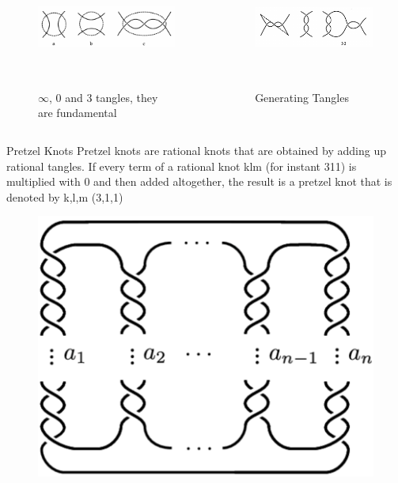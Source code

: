 \begin{frame}
	\begin{columns}[T]
		\begin{column}{.48\textwidth}
			\begin{figure}
				\centering
				\includegraphics[width=0.9\linewidth,height=4cm]{images/basictangles.png}
				\caption{$\infty$, 0 and 3 tangles, they are \centering fundamental}
				\label{basictangles}
			\end{figure}
			\cite{adams2004knot}
		\end{column}
		\begin{column}{.48\textwidth}
			\begin{figure}[h]
				\centering
				\includegraphics[width=0.9\linewidth,height=4cm]{images/tangleproduce.png}
				\caption{Generating Tangles}
				\label{generating}
			\end{figure}
		\end{column}
	\end{columns}
\end{frame}
\begin{frame}{Pretzel Knots}
	Pretzel knots are rational knots that are obtained by adding up rational tangles. If every term of a rational knot klm (for instant 311) is multiplied with 0 and then added altogether, the result is a pretzel knot that is denoted by k,l,m (3,1,1)
	\begin{figure}
		\centering
		\includegraphics[width=0.4\linewidth]{images/pretzel.png}
		\label{pretzel}
		\cite{article2}
	\end{figure}
\end{frame}
